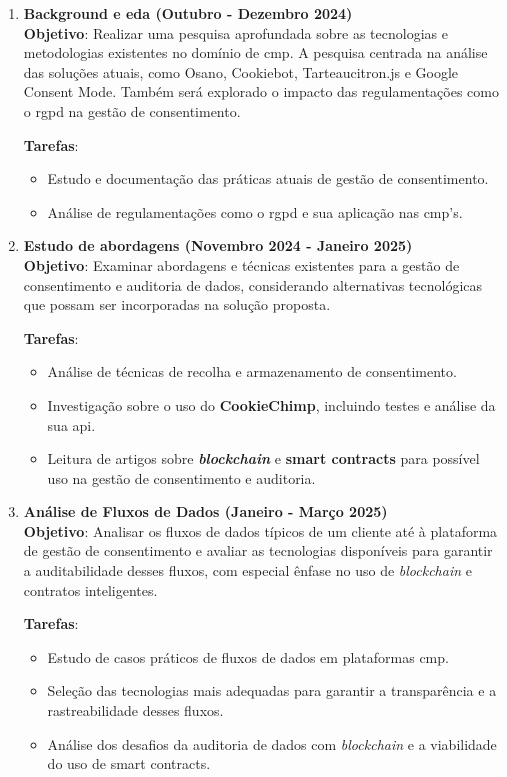 \begin{enumerate} 
    \item \textbf{Background e \acrlong{eda} (Outubro - Dezembro 2024)} \\
    \textbf{Objetivo}: Realizar uma pesquisa aprofundada sobre as tecnologias e metodologias existentes no domínio de \acrfull{cmp}. A pesquisa centrada na análise das soluções atuais, como Osano, Cookiebot, Tarteaucitron.js e Google Consent Mode. Também será explorado o impacto das regulamentações como o \acrshort{rgpd} na gestão de consentimento.
    
    \textbf{Tarefas}:
    \begin{itemize}
        \item Estudo e documentação das práticas atuais de gestão de consentimento.
        \item Análise de regulamentações como o \acrshort{rgpd} e sua aplicação nas \acrshort{cmp}'s.
    \end{itemize}

    \item \textbf{Estudo de abordagens (Novembro 2024 - Janeiro 2025)} \\
    \textbf{Objetivo}: Examinar abordagens e técnicas existentes para a gestão de consentimento e auditoria de dados, considerando alternativas tecnológicas que possam ser incorporadas na solução proposta.
    
    \textbf{Tarefas}:
    \begin{itemize}
        \item Análise de técnicas de recolha e armazenamento de consentimento.
        \item Investigação sobre o uso do \textbf{CookieChimp}, incluindo testes e análise da sua \acrshort{api}.
        \item Leitura de artigos sobre \textbf{\textit{blockchain}} e \textbf{smart contracts} para possível uso na gestão de consentimento e auditoria.
    \end{itemize}

    \item \textbf{Análise de Fluxos de Dados (Janeiro - Março 2025)} \\
    \textbf{Objetivo}: Analisar os fluxos de dados típicos de um cliente até à plataforma de gestão de consentimento e avaliar as tecnologias disponíveis para garantir a auditabilidade desses fluxos, com especial ênfase no uso de \textit{blockchain} e contratos inteligentes.
    
    \textbf{Tarefas}:
    \begin{itemize}
        \item Estudo de casos práticos de fluxos de dados em plataformas \acrshort{cmp}.
        \item Seleção das tecnologias mais adequadas para garantir a transparência e a rastreabilidade desses fluxos.
        \item Análise dos desafios da auditoria de dados com \textit{blockchain} e a viabilidade do uso de smart contracts.
    \end{itemize}


\end{enumerate}
